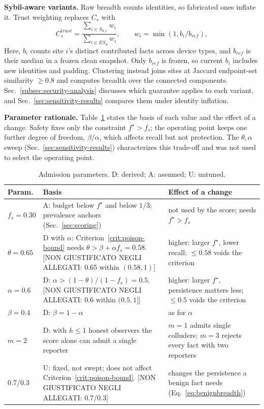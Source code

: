 \documentclass[journal]{IEEEtran}
\theoremstyle{definition}
\newcommand{\nongiust}[1]{{\color{red}[NON GIUSTIFICATO NEGLI ALLEGATI: #1]}}
\begin{document}
\textbf{Sybil-aware variants.} Raw breadth counts identities, so fabricated ones inflate it. Trust weighting replaces $C_s$ with
\[
C_s^{trust}=\frac{\sum_{i\in S_{d,e}}w_i}{\sum_{i\in ES_d}w_i},\qquad w_i=\min(1,b_i/b_{ref}),
\]
Here, $b_i$ counts site $i$'s distinct contributed facts across device types, and $b_{ref}$ is their median in a frozen clean snapshot. Only $b_{ref}$ is frozen, so current $b_i$ includes new identities and padding. Clustering instead joins sites at Jaccard endpoint-set similarity $\ge0.8$ and computes breadth over the connected components. Sec.~\ref{subsec:security-analysis} discusses which guarantee applies to each variant, and Sec.~\ref{sec:sensitivity-results} compares them under identity inflation.

\textbf{Parameter rationale.} Table~\ref{tab:params} states the basis of each value and the effect of a change. Safety fixes only the constraint $f^\star>f_s$; the operating point keeps one further degree of freedom, $\beta/\alpha$, which affects recall but not protection. The $\theta,\alpha$ sweep (Sec.~\ref{sec:sensitivity-results}) characterizes this trade-off and was not used to select the operating point.

\begin{table}[t]
\centering
\caption{Admission parameters. D: derived; A: assumed; U: untuned.}
\label{tab:params}
\scriptsize
\begin{tabular}{@{}p{0.95cm}p{3.35cm}p{2.85cm}@{}}
\toprule
Param. & Basis & Effect of a change \\
\midrule
$f_s=0.30$ & A: budget below $f^\star$ and below $1/3$; prevalence anchors (Sec.~\ref{sec:scoring}) & not used by the score; needs $f^\star>f_s$ \\
$\theta=0.65$ & D with $\alpha$: Criterion~\ref{crit:poison-bound} needs $\theta>\beta+\alpha f_s=0.58$. \nongiust{0.65 within $(0.58,1)$} & higher: larger $f^\star$, lower recall; $\le0.58$ voids the criterion \\
$\alpha=0.6$ & D: $\alpha>(1-\theta)/(1-f_s)=0.5$. \nongiust{0.6 within $(0.5,1]$} & higher: larger $f^\star$, persistence matters less; $\le0.5$ voids the criterion \\
$\beta=0.4$ & D: $\beta=1-\alpha$ & as for $\alpha$ \\
$m=2$ & D: with $h\le1$ honest observers the score alone can admit a single reporter & $m=1$ admits single colluders; $m=3$ rejects every fact with two reporters \\
0.7/0.3 & U: fixed, not swept; does not affect Criterion~\ref{crit:poison-bound}. \nongiust{0.7/0.3} & changes the persistence a benign fact needs (Eq.~\ref{eq:benignbreadth}) \\
\bottomrule
\end{tabular}
\end{table}
\end{document}
